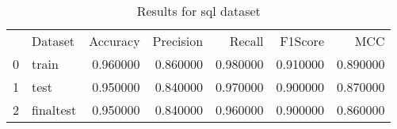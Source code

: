 \begin{table}
\caption{Results for sql dataset}
\begin{tabular}{llrrrrr}
 & Dataset & Accuracy & Precision & Recall & F1Score & MCC \\
0 & train & 0.960000 & 0.860000 & 0.980000 & 0.910000 & 0.890000 \\
1 & test & 0.950000 & 0.840000 & 0.970000 & 0.900000 & 0.870000 \\
2 & finaltest & 0.950000 & 0.840000 & 0.960000 & 0.900000 & 0.860000 \\
\end{tabular}
\end{table}
